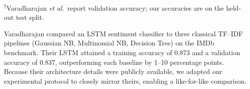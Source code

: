 \documentclass[conference]{IEEEtran}
\begin{document}
\begin{table}[htbp]
  \caption{Accuracy comparison between our LSTM variants and the models reported by Varadharajan \textit{et al.}}
  \label{tab:comparison_lstm_varadharajan}
  \centering
  \renewcommand{\arraystretch}{1.15}
  \setlength{\tabcolsep}{4pt} %
  \footnotesize              %

  \vspace*{2pt}
  \begin{flushleft}
  \footnotesize
  \textsuperscript{$\dagger$}Varadharajan \textit{et al.}\ report validation accuracy; our accuracies are on the held-out test split.
  \end{flushleft}
\end{table}


Varadharajan \cite{Varadharajan2024} compared an LSTM sentiment classifier to three classical TF–IDF pipelines (Gaussian NB, Multinomial NB, Decision Tree) on the IMDb benchmark.  Their LSTM attained a training accuracy of 0.873 and a validation accuracy of 0.837, outperforming each baseline by 1–10 percentage points.  Because their architecture details were publicly available, we adapted our experimental protocol to closely mirror theirs, enabling a like-for-like comparison.
\end{document}
